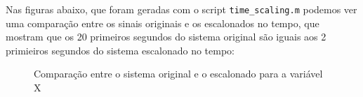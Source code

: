 \documentclass[12pt]{article}
\begin{document}
    Nas figuras abaixo, que foram geradas com o script \texttt{time\_scaling.m} podemos ver uma comparação entre os sinais originais e os escalonados no tempo, que mostram que os 20 primeiros segundos do sistema original são iguais aos 2 primieiros segundos do sistema escalonado no tempo:
    \begin{figure}[H]
        \caption{Comparação entre o sistema original e o escalonado para a variável X}
    \end{figure}
\end{document}
